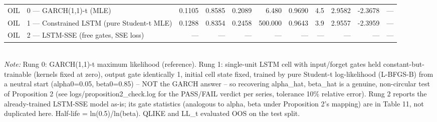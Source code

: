\begin{table}[ht]
\begin{tabular}{llrrrrrrrrr}
OIL & 0 — GARCH(1,1)-t (MLE) & 0.1105 & 0.8585 & 0.2089 & 6.480 & 0.9690 & 4.5 & 2.9582 & -2.3678 & — \\
OIL & 1 — Constrained LSTM (pure Student-t MLE) & 0.1288 & 0.8354 & 0.2458 & 500.000 & 0.9643 & 3.9 & 2.9557 & -2.3959 & — \\
OIL & 2 — LSTM-SSE (free gates, SSE loss) & — & — & — & — & — & — & — & — & — \\
\bottomrule
\end{tabular}
\\[3pt]\footnotesize\textit{Note:} Rung 0: GARCH(1,1)-t maximum likelihood (reference). Rung 1: single-unit LSTM cell with input/forget gates held constant-but-trainable (kernels fixed at zero), output gate identically 1, initial cell state fixed, trained by pure Student-t log-likelihood (L-BFGS-B) from a neutral start (alpha0=0.05, beta0=0.85) -- NOT the GARCH answer -- so recovering alpha\_hat, beta\_hat is a genuine, non-circular test of Proposition 2 (see logs/proposition2\_check.log for the PASS/FAIL verdict per series, tolerance 10\% relative error). Rung 2 reports the already-trained LSTM-SSE model as-is; its gate statistics (analogous to alpha, beta under Proposition 2's mapping) are in Table 11, not duplicated here. Half-life = ln(0.5)/ln(beta). QLIKE and LL\_t evaluated OOS on the test split.
\end{table}